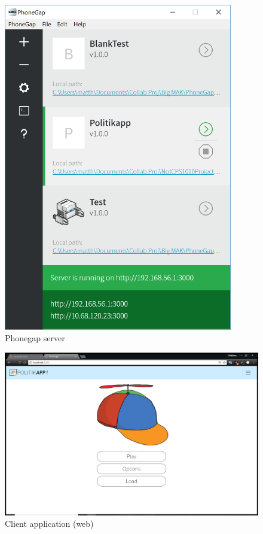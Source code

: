 \documentclass[paper=a4,fontsize=11pt]{article}
\begin{document}
\begin{figure}[H]
  \caption{Phonegap server}
  \hfill\includegraphics[width=10cm]{Walkthrough/Client_app_started.PNG}\hspace*{\fill}
\end{figure}
\begin{figure}[H]
  \caption{Client application (web)}
  \hfill\includegraphics[width=13cm]{Walkthrough/Client_app.PNG}\hspace*{\fill}
\end{figure}
\end{document}

